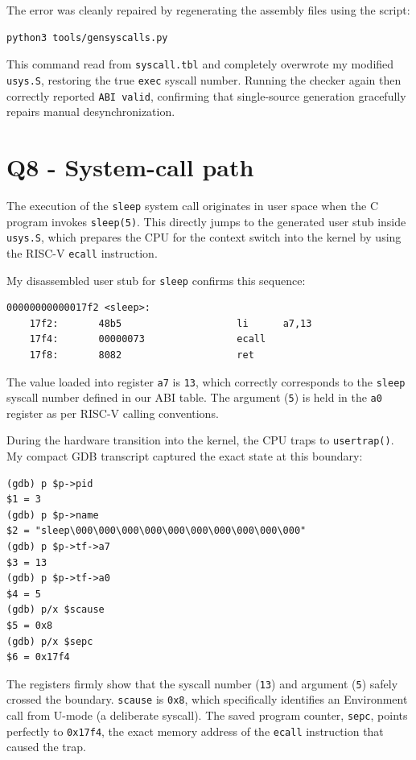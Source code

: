 \documentclass[11pt,a4paper]{article}
\begin{document}
The error was cleanly repaired by regenerating the assembly files using the script:
\begin{verbatim}
python3 tools/gensyscalls.py
\end{verbatim}

This command read from \texttt{syscall.tbl} and completely overwrote my modified \texttt{usys.S}, restoring the true \texttt{exec} syscall number. Running the checker again then correctly reported \texttt{ABI valid}, confirming that single-source generation gracefully repairs manual desynchronization.

\section*{Q8 - System-call path}

The execution of the \texttt{sleep} system call originates in user space when the C program invokes \texttt{sleep(5)}. This directly jumps to the generated user stub inside \texttt{usys.S}, which prepares the CPU for the context switch into the kernel by using the RISC-V \texttt{ecall} instruction.

My disassembled user stub for \texttt{sleep} confirms this sequence:
\begin{verbatim}
00000000000017f2 <sleep>:
    17f2:       48b5                    li      a7,13
    17f4:       00000073                ecall
    17f8:       8082                    ret
\end{verbatim}

The value loaded into register \texttt{a7} is \texttt{13}, which correctly corresponds to the \texttt{sleep} syscall number defined in our ABI table. The argument (\texttt{5}) is held in the \texttt{a0} register as per RISC-V calling conventions.

During the hardware transition into the kernel, the CPU traps to \texttt{usertrap()}. My compact GDB transcript captured the exact state at this boundary:
\begin{verbatim}
(gdb) p $p->pid
$1 = 3
(gdb) p $p->name
$2 = "sleep\000\000\000\000\000\000\000\000\000\000"
(gdb) p $p->tf->a7
$3 = 13
(gdb) p $p->tf->a0
$4 = 5
(gdb) p/x $scause
$5 = 0x8
(gdb) p/x $sepc
$6 = 0x17f4
\end{verbatim}

The registers firmly show that the syscall number (\texttt{13}) and argument (\texttt{5}) safely crossed the boundary. \texttt{scause} is \texttt{0x8}, which specifically identifies an Environment call from U-mode (a deliberate syscall). The saved program counter, \texttt{sepc}, points perfectly to \texttt{0x17f4}, the exact memory address of the \texttt{ecall} instruction that caused the trap.
\end{document}
